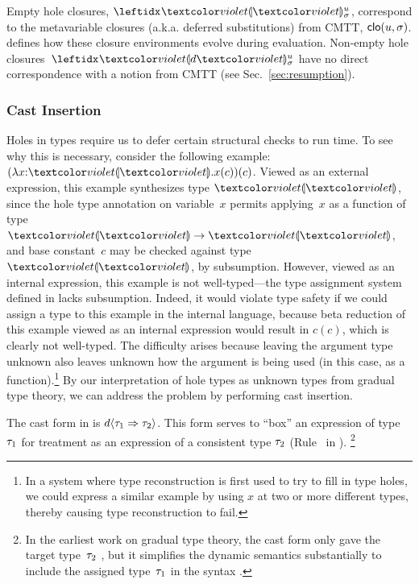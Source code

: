 Empty hole closures, $\dehole{u}{\sigma}{}$,  correspond to the metavariable closures (a.k.a. deferred substitutions) from CMTT, $\mathsf{clo}(u, \sigma)$.
%
 defines how these closure environments evolve during evaluation.
%
Non-empty hole closures~$\dhole{d}{u}{\sigma}{}$ have no direct correspondence with a notion from CMTT (see Sec.~\ref{sec:resumption}).

\subsubsection{Cast Insertion}\label{sec:cast-insertion}
%
%
Holes in types require us to defer certain structural checks to run time.
%
To see why this is necessary, consider the following
example: $\hap{(\halam{x}{\tehole}{\hap{x}{c}})}{c}$.
%
Viewed as an external expression, this example synthesizes type
$\tehole$, since the hole type annotation on variable~$x$ permits
applying~$x$ as a function of type~$\tarr{\tehole}{\tehole}$, and base
constant~$c$ may be checked against type~$\tehole$, by subsumption.
%
However, viewed as an internal expression, this example is not
well-typed---the type assignment system defined in
 lacks subsumption.
%
Indeed, it would violate type safety if we could assign a type to this
example in the internal language, because beta reduction of this
example viewed as an internal expression would result in $c(c)$, which
is clearly not well-typed.
%
The difficulty arises because leaving the argument type unknown also leaves unknown how
the argument is being used (in this case, as a function).\footnote{In a system where type reconstruction is first used
to try to fill in type holes, we could express a similar example by
using $x$ at two or more different types, thereby causing type
reconstruction to fail.
%
}
By our interpretation of hole types as unknown types from gradual type
theory, we can address the problem by performing cast insertion.
%

The cast form in \HazelnutLive is $d \langle{\tau_1}\Rightarrow{\tau_2}\rangle$.
%
This form serves to ``box'' an expression of type $\tau_1$ for
treatment as an expression of a consistent type $\tau_2$
(Rule~ in ).%
\footnote{
In the earliest work on gradual type theory, the cast form only gave
the target type~$\tau_2$ \cite{Siek06a}, but it simplifies the dynamic semantics substantially
to include the assigned type~$\tau_1$ in the syntax \cite{DBLP:conf/snapl/SiekVCB15}.
}

